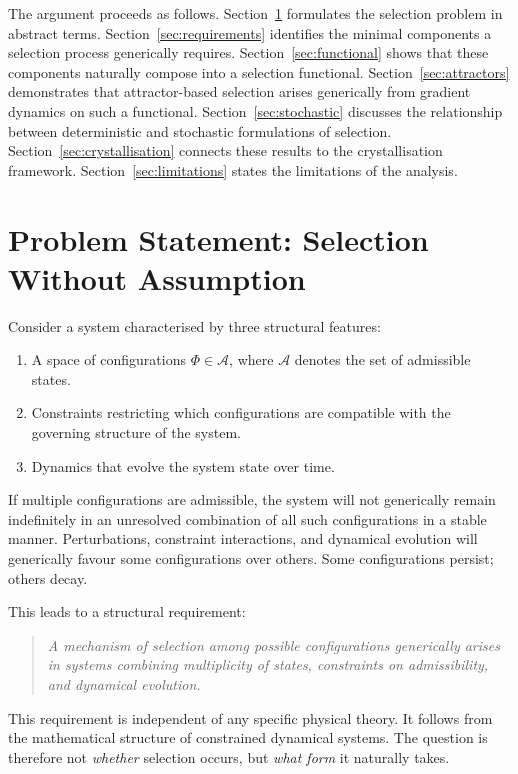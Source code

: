 \documentclass[12pt]{article}
\begin{document}
The argument proceeds as follows. Section~\ref{sec:problem} formulates the selection problem in abstract terms. Section~\ref{sec:requirements} identifies the minimal components a selection process generically requires. Section~\ref{sec:functional} shows that these components naturally compose into a selection functional. Section~\ref{sec:attractors} demonstrates that attractor-based selection arises generically from gradient dynamics on such a functional. Section~\ref{sec:stochastic} discusses the relationship between deterministic and stochastic formulations of selection. Section~\ref{sec:crystallisation} connects these results to the crystallisation framework. Section~\ref{sec:limitations} states the limitations of the analysis.

\section{Problem Statement: Selection Without Assumption}\label{sec:problem}

Consider a system characterised by three structural features:
\begin{enumerate}
    \item A space of configurations $\Phi \in \mathcal{A}$, where $\mathcal{A}$ denotes the set of admissible states.
    \item Constraints restricting which configurations are compatible with the governing structure of the system.
    \item Dynamics that evolve the system state over time.
\end{enumerate}

If multiple configurations are admissible, the system will not generically remain indefinitely in an unresolved combination of all such configurations in a stable manner. Perturbations, constraint interactions, and dynamical evolution will generically favour some configurations over others. Some configurations persist; others decay.

This leads to a structural requirement:
\begin{quote}
    \textit{A mechanism of selection among possible configurations generically arises in systems combining multiplicity of states, constraints on admissibility, and dynamical evolution.}
\end{quote}

This requirement is independent of any specific physical theory. It follows from the mathematical structure of constrained dynamical systems. The question is therefore not \textit{whether} selection occurs, but \textit{what form} it naturally takes.
\end{document}
